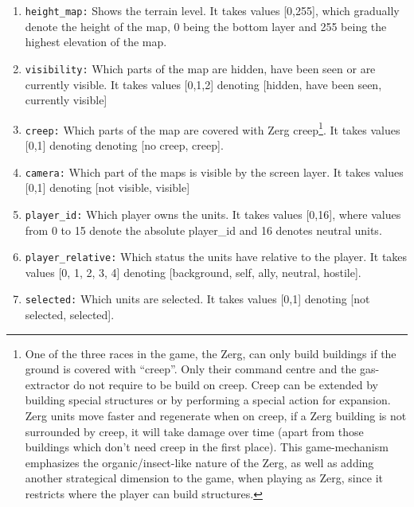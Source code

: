 \documentclass{article}
\begin{document}
\begin{enumerate}[noitemsep,start=0]
\item \texttt{height\_map:} Shows the terrain level. It takes values [0,255], 
which gradually denote the height of the map, 0 being the bottom layer and 255 
being the highest elevation of the map.
\item \texttt{visibility:} Which parts of the map are hidden, have been seen or 
are currently visible. It takes values [0,1,2] denoting [hidden, have been 
seen, currently visible]
\item \texttt{creep:} Which parts of the map are covered with Zerg 
creep\footnote{One of the three races in the game, the Zerg, can only build 
buildings if the ground is covered with ``creep''. Only their command centre 
and the gas-extractor do not require to be build on creep. Creep can be 
extended by building special structures or by performing a special action for 
expansion. Zerg units move faster and regenerate when on creep, if a Zerg 
building is not surrounded by creep, it will take damage over time (apart from 
those buildings which don't need creep in the first place). This 
game-mechanism  emphasizes the organic/insect-like nature of the Zerg, as well 
as adding another strategical dimension to the game, when playing as Zerg, 
since it restricts where the player can build structures.}. It takes values 
[0,1] denoting denoting [no creep, creep].
\item \texttt{camera:} Which part of the maps is visible by the screen layer. 
It takes values [0,1] denoting [not visible, visible]
\item \texttt{player\_id:} Which player owns the units. It takes values [0,16], 
where values from 0 to 15 denote the absolute player\_id and 16 denotes neutral 
units.
\item \texttt{player\_relative:} Which status the units have relative to the 
player. It takes values [0, 1, 2, 3, 4] denoting [background, self, ally, 
neutral, hostile].
\item \texttt{selected:} Which units are selected. It takes values [0,1] 
denoting [not selected, selected].
\end{enumerate}
\end{document}
